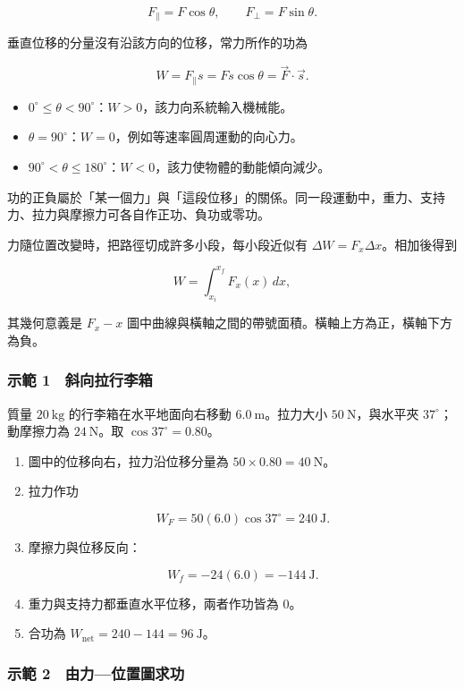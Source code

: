 \documentclass[11pt,a4paper]{article}
\providecommand{\tightlist}{%
  \setlength{\itemsep}{0pt}\setlength{\parskip}{0pt}}
\begin{document}
\[
F_\parallel=F\cos\theta,
\qquad
F_\perp=F\sin\theta.
\]

垂直位移的分量沒有沿該方向的位移，常力所作的功為

\[
W=F_\parallel s=Fs\cos\theta=\vec F\cdot\vec s.
\]

\begin{itemize}
\tightlist
\item
  \(0^\circ\leq\theta<90^\circ\)：\(W>0\)，該力向系統輸入機械能。
\item
  \(\theta=90^\circ\)：\(W=0\)，例如等速率圓周運動的向心力。
\item
  \(90^\circ<\theta\leq180^\circ\)：\(W<0\)，該力使物體的動能傾向減少。
\end{itemize}

功的正負屬於「某一個力」與「這段位移」的關係。同一段運動中，重力、支持力、拉力與摩擦力可各自作正功、負功或零功。

力隨位置改變時，把路徑切成許多小段，每小段近似有 \(\Delta W=F_x\Delta x\)。相加後得到

\[
W=\int_{x_i}^{x_f}F_x(x)\,dx,
\]

其幾何意義是 \(F_x-x\) 圖中曲線與橫軸之間的帶號面積。橫軸上方為正，橫軸下方為負。

\subsubsection{示範 1　斜向拉行李箱}\label{ux793aux7bc4-1-ux659cux5411ux62c9ux884cux674eux7bb1}

質量 \(20\ \mathrm{kg}\) 的行李箱在水平地面向右移動 \(6.0\ \mathrm m\)。拉力大小 \(50\ \mathrm N\)，與水平夾 \(37^\circ\)；動摩擦力為 \(24\ \mathrm N\)。取 \(\cos37^\circ=0.80\)。

\begin{enumerate}
\def\labelenumi{\arabic{enumi}.}
\item
  圖中的位移向右，拉力沿位移分量為 \(50\times0.80=40\ \mathrm N\)。
\item
  拉力作功

  \[W_F=50(6.0)\cos37^\circ=240\ \mathrm J.\]
\item
  摩擦力與位移反向：

  \[W_f=-24(6.0)=-144\ \mathrm J.\]
\item
  重力與支持力都垂直水平位移，兩者作功皆為 \(0\)。
\item
  合功為 \(W_{\mathrm{net}}=240-144=96\ \mathrm J\)。
\end{enumerate}

\subsubsection{示範 2　由力---位置圖求功}\label{ux793aux7bc4-2-ux7531ux529bux4f4dux7f6eux5716ux6c42ux529f}
\end{document}
